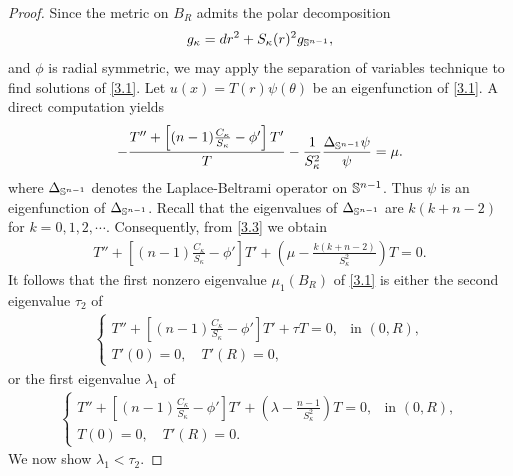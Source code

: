 \documentclass[11pt,leqno]{amsart}
\def\k{\kappa}
\def\l{\lambda}
\def\S{\Bbb S}
\def\k{\kappa}
\numberwithin{equation}{section}
\begin{document}
\begin{proof}
Since the  metric on $B_R$ admits  the polar decomposition $$g_\k=dr^2+S_\k(r)^2 g_{\S^{n-1}},$$  and $\phi$ is radial symmetric, we may apply the separation of variables
technique to find solutions of \eqref{3.1}. 
Let $u(x)=T(r)\psi(\theta)$ be an eigenfunction of \eqref{3.1}. A   direct computation yields
\begin{align}\label{3.3}
   -\frac{T'' + \left[(n-1)\frac{C_\kappa}{S_\kappa} - \phi'\right]T'}{T} -\frac 1 {S_\k^2}\frac{\Delta_{\S^{n-1}}\psi}{\psi}=\mu.
\end{align}
where $\Delta_{\S^{n-1}}$ denotes the  Laplace-Beltrami operator  on $\S^{n-1}$. Thus $\psi$ is an eigenfunction of $\Delta_{\S^{n-1}}$.
Recall that  the eigenvalues of $\Delta_{\S^{n-1}}$ are $k(k+n-2)$  for $k=0, 1, 2, \cdots$. Consequently, from  \eqref{3.3} we obtain 
\begin{align*} 
T'' + \left[(n-1)\frac{C_\kappa}{S_\kappa} - \phi'\right]T' + \left(\mu - \frac{k(k+n-2)}{S_\kappa^2}\right)T = 0.
\end{align*}
It follows that the first nonzero eigenvalue $\mu_1(B_R)$ of  \eqref{3.1}  is either the second eigenvalue $\tau_2$ of
 \begin{align}
     \begin{cases}\label{3.4}
T'' + \left[(n-1)\frac{C_\kappa}{S_\kappa} - \phi'\right]T'+ \tau T = 0, & \text{in } (0,R),\\
T'(0) = 0,\quad T'(R)  = 0,
\end{cases}
 \end{align}
or the first eigenvalue $\l_1$ of 
\begin{align}\label{3.5}
    \begin{cases}
T'' + \left[(n-1)\frac{C_\kappa}{S_\kappa} - \phi'\right]T'+ (\l-\frac{n-1}{S_\k^2})T=0, & \text{in } (0,R),\\
T(0) = 0,\quad T'(R) = 0.
\end{cases}
\end{align}
We now show $\l_1<\tau_2$.


\end{proof}
\end{document}
